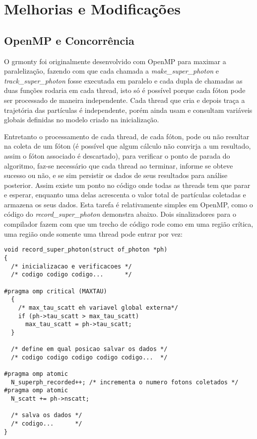 \section{Melhorias e Modificações}
  \subsection{OpenMP e Concorrência}
    O grmonty foi originalmente desenvolvido com OpenMP para maximar a paralelização, fazendo com que cada chamada a \textit{make\_super\_photon} e \textit{track\_super\_photon} fosse executada em paralelo e cada dupla de chamadas as duas funções rodaria em cada thread, isto só é possível porque cada fóton pode ser processado de maneira independente. Cada thread que cria e depois traça a trajetória das partículas é independente, porém ainda usam e consultam variáveis globais definidas no modelo criado na inicialização.

    Entretanto o processamento de cada thread, de cada fóton, pode ou não resultar na coleta de um fóton (é possível que algum cálculo não convirja a um resultado, assim o fóton associado é descartado), para verificar o ponto de parada do algoritmo, faz-se necessário que cada thread ao terminar, informe se obteve sucesso ou não, e se sim persistir os dados de seus resultados para análise posterior. Assim existe um ponto no código onde todas as threads tem que parar e esperar, enquanto uma delas acrescenta o valor total de partículas coletadas e armazena os seus dados. Esta tarefa é relativamente simples em OpenMP, como o código do \textit{record\_super\_photon} demonstra abaixo. Dois sinalizadores para o compilador fazem com que um trecho de código rode como em uma região crítica, uma região onde somente uma thread pode entrar por vez:

    \begin{lstlisting}
void record_super_photon(struct of_photon *ph)
{
  /* inicializacao e verificacoes */
  /* codigo codigo codigo...      */

#pragma omp critical (MAXTAU)
  {
    /* max_tau_scatt eh variavel global externa*/
    if (ph->tau_scatt > max_tau_scatt)
      max_tau_scatt = ph->tau_scatt;
  }

  /* define em qual posicao salvar os dados */
  /* codigo codigo codigo codigo codigo...  */

#pragma omp atomic
  N_superph_recorded++; /* incrementa o numero fotons coletados */
#pragma omp atomic
  N_scatt += ph->nscatt;

  /* salva os dados */
  /* codigo...      */
}
    \end{lstlisting}

